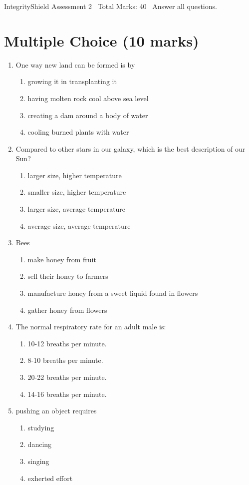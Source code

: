 \documentclass[12pt]{article}
\begin{document}
\begin{center}
IntegrityShield Assessment 2 \
Total Marks: 40 \
Answer all questions.
\end{center}

\section*{Multiple Choice (10 marks)}
\begin{enumerate}[label=\arabic*.]
\item One way new land can be formed is by
\begin{enumerate}[label=(\alph*)]
    \item growing it in transplanting it
    \item having molten rock cool above sea level
    \item creating a dam around a body of water
    \item cooling burned plants with water
\end{enumerate}
\item Compared to other stars in our galaxy, which is the best description of our Sun?
\begin{enumerate}[label=(\alph*)]
    \item larger size, higher temperature
    \item smaller size, higher temperature
    \item larger size, average temperature
    \item average size, average temperature
\end{enumerate}
\item Bees
\begin{enumerate}[label=(\alph*)]
    \item make honey from fruit
    \item sell their honey to farmers
    \item manufacture honey from a sweet liquid found in flowers
    \item gather honey from flowers
\end{enumerate}
\item The normal respiratory rate for an adult male is:
\begin{enumerate}[label=(\alph*)]
    \item 10-12 breaths per minute.
    \item 8-10 breaths per minute.
    \item 20-22 breaths per minute.
    \item 14-16 breaths per minute.
\end{enumerate}
\item pushing an object requires
\begin{enumerate}[label=(\alph*)]
    \item studying
    \item dancing
    \item singing
    \item exherted effort
\end{enumerate}
\end{enumerate}
\end{document}
